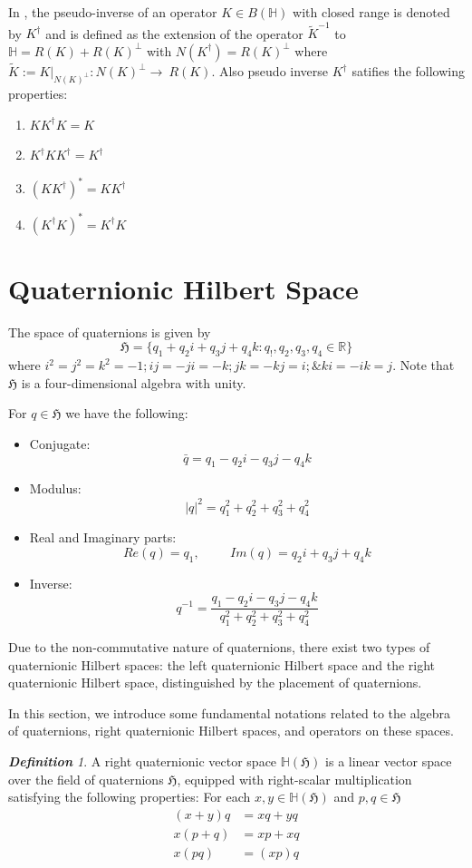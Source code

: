 \documentclass[a4paper,12pt,reqno]{amsart}
\theoremstyle{plain}
\theoremstyle{remark}
\newtheorem{definition}[theorem]{\bf Definition}
\begin{document}
	
	In \cite{b}, the pseudo-inverse of an operator $K\in B(\mathbb{H})$ with closed range is denoted by $K^{\dagger}$ and is defined as the extension of the operator $\widetilde{K}^{-1}$ to $\mathbb{H}=R(K)+R(K)^{\perp}$ with $N(K^{\dagger})=R(K)^{\perp}$ where $\widetilde{K}:=K|_{N(K)^{\perp}}:N(K)^{\perp}\to\ R(K)$.   Also pseudo inverse $K^{\dagger}$ satifies the following properties:
	\begin{enumerate}
		\item[(i)] $KK^\dagger K=K$
		\item[(ii)] $K^{\dagger}KK^{\dagger}=K^{\dagger}$
		\item[(iii)] $(KK^{\dagger})^{*}=KK^{\dagger}$
		\item[(iv)] $(K^{\dagger}K)^*=K^{\dagger}K$
	\end{enumerate}
	
	
	
	\section{Quaternionic Hilbert Space}
	
	The space of quaternions is given by 
	$$\mathfrak{H}=\{q_1+q_2i+q_3j+q_4k: q_!,q_2,q_3,q_4\in \mathbb{R}\}$$
	where $i^2=j^2=k^2=-1; ij=-ji=-k; jk=-kj=i; \& ki=-ik=j.$  Note that $\mathfrak{H}$ is a four-dimensional algebra with unity. 
	
	For $q\in\mathfrak{H}$ we have the following:
	\begin{itemize}
		\item Conjugate: $$\bar{q}=q_1-q_2i-q_3j-q_4k$$
		\item Modulus: $$|q|^2=q_1^2+q_2^2+q_3^2+q_4^2$$
		\item Real and Imaginary parts: $$Re(q)=q_1, \hspace{1cm}Im(q)=q_2i+q_3j+q_4k$$
		\item Inverse: $$q^{-1}=\frac{q_1-q_2i-q_3j-q_4k}{q_1^2+q_2^2+q_3^2+q_4^2}$$
	\end{itemize} 
	
	Due to the non-commutative nature of quaternions, there exist two types of quaternionic Hilbert spaces: the left quaternionic Hilbert space and the right quaternionic Hilbert space, distinguished by the placement of quaternions.
	
	In this section, we introduce some fundamental notations related to the algebra of quaternions, right quaternionic Hilbert spaces, and operators on these spaces.
	
	\begin{definition}
		A right quaternionic vector space $\mathbb{H}(\mathfrak{H})$ is a linear vector space over the field of quaternions $\mathfrak{H}$, equipped with right-scalar multiplication satisfying the following properties:
		For each $x,y \in \mathbb{H}(\mathfrak{H})$ and $p,q \in \mathfrak{H} $
		\begin{align*}
			(x+y)q&=xq+yq\\
			x(p+q)&=xp+xq\\
			x(pq)&=(xp)q
		\end{align*}
	\end{definition}
	
\end{document}
